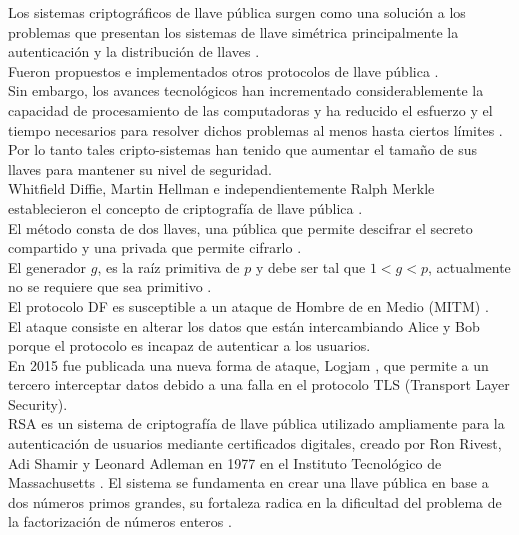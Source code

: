\documentclass[10pt,letterpaper]{article}
\begin{document}
Los sistemas criptográficos de llave pública surgen como una solución a los problemas que presentan los sistemas de llave simétrica principalmente la autenticación y la distribución de llaves \cite{alese2012comparative}.\\

Fueron propuestos e implementados otros protocolos de llave pública \cite{rabah2005theory}.\\

 Sin embargo, los avances tecnológicos han incrementado considerablemente la capacidad de procesamiento de las computadoras y ha reducido el esfuerzo y el tiempo necesarios para resolver dichos problemas al menos hasta ciertos límites \cite{berta2003implementing}. Por lo tanto tales cripto-sistemas han tenido que aumentar el tamaño de sus llaves para mantener su nivel de seguridad.\\
 
 Whitfield Diffie, Martin Hellman e independientemente Ralph Merkle establecieron el concepto de criptografía de llave pública \cite{diffie1976new,merkle1978secure}.\\
 
El método consta de dos llaves, una pública que permite descifrar el secreto compartido y una privada que permite cifrarlo \cite{nath2010symmetric}.\\


 El generador $g$, es la raíz primitiva de $p$ y debe ser tal que $1<g<p$, actualmente no se requiere que  sea primitivo \cite{schneier2007applied}.\\
 
El protocolo DF es susceptible a un ataque de Hombre de en Medio (MITM) \cite{diffie1976new}.\\

El ataque consiste en alterar los datos que están intercambiando Alice y Bob \cite{roy2016brief} porque el protocolo es incapaz de autenticar a los usuarios.\\

En 2015 fue publicada una nueva forma de ataque, Logjam \cite{adrian2015imperfect}, que permite a un tercero interceptar datos debido a una falla en el protocolo TLS (Transport Layer Security).\\

RSA es un sistema de criptografía de llave pública utilizado ampliamente para la autenticación de usuarios mediante certificados digitales, creado por Ron Rivest, Adi Shamir y Leonard Adleman en 1977 en el Instituto Tecnológico de Massachusetts \cite{rivest1978method}. El sistema se fundamenta en crear una llave pública en base a dos números primos grandes, su fortaleza radica en la dificultad del problema de la factorización de números enteros \cite{brent2000recent}.\\
\end{document}

